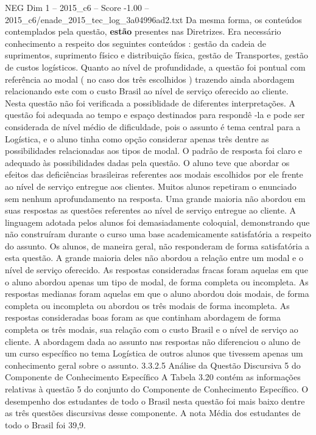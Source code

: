 \begin{textsample}{NEG Dim 1 – 2015\_c6 – Score -1.00 – 2015\_c6/enade\_2015\_tec\_log\_3a04996ad2.txt}
Da mesma forma, os conteúdos contemplados pela questão, \textbf{estão} presentes nas Diretrizes.
Era necessário conhecimento a respeito dos seguintes conteúdos : gestão da cadeia de suprimentos, suprimento físico e distribuição física, gestão de Transportes, gestão de custos logísticos.
Quanto ao nível de profundidade, a questão foi pontual com referência ao modal ( no caso dos três escolhidos ) trazendo ainda abordagem relacionando este com o custo Brasil ao nível de serviço oferecido ao cliente.
Nesta questão não foi verificada a possiblidade de diferentes interpretações.
A questão foi adequada ao tempo e espaço destinados para respondê -la e pode ser considerada de nível médio de dificuldade, pois o assunto é tema central para a Logística, e o aluno tinha como opção considerar apenas três dentre as possibilidades relacionadas aos tipos de modal.
O padrão de resposta foi claro e adequado às possibilidades dadas pela questão.
O aluno teve que abordar os efeitos das deficiências brasileiras referentes aos modais escolhidos por ele frente ao nível de serviço entregue aos clientes.
Muitos alunos repetiram o enunciado sem nenhum aprofundamento na resposta.
Uma grande maioria não abordou em suas respostas as questões referentes ao nível de serviço entregue ao cliente.
A linguagem adotada pelos alunos foi demasiadamente coloquial, demonstrando que não construíram durante o curso uma base academicamente satisfatória a respeito do assunto.
Os alunos, de maneira geral, não responderam de forma satisfatória a esta questão.
A grande maioria deles não abordou a relação entre um modal e o nível de serviço oferecido.
As respostas consideradas fracas foram aquelas em que o aluno abordou apenas um tipo de modal, de forma completa ou incompleta.
As respostas medianas foram aquelas em que o aluno abordou dois modais, de forma completa ou incompleta ou abordou os três modais de forma incompleta.
As respostas consideradas boas foram as que continham abordagem de forma completa os três modais, sua relação com o custo Brasil e o nível de serviço ao cliente.
A abordagem dada ao assunto nas respostas não diferenciou o aluno de um curso específico no tema Logística de outros alunos que tivessem apenas um conhecimento geral sobre o assunto. 3.3.2.5 Análise da Questão Discursiva 5 do Componente de Conhecimento Específico A Tabela 3.20 contém as informações relativas à questão 5 do conjunto do Componente de Conhecimento Específico.
O desempenho dos estudantes de todo o Brasil nesta questão foi mais baixo dentre as três questões discursivas desse componente.
A nota Média dos estudantes de todo o Brasil foi 39,9.

\end{textsample}
